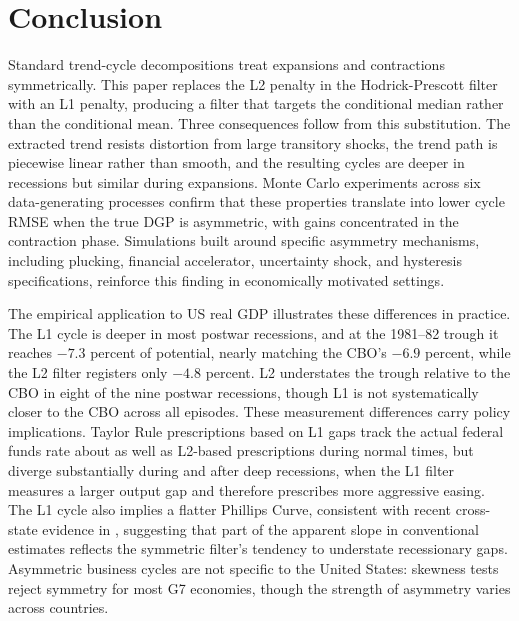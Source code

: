 \documentclass[10pt]{article}
\begin{document}
\section{Conclusion}
\label{sec:conclusion}

Standard trend-cycle decompositions treat expansions and contractions symmetrically. This paper replaces the L2 penalty in the Hodrick-Prescott filter with an L1 penalty, producing a filter that targets the conditional median rather than the conditional mean. Three consequences follow from this substitution. The extracted trend resists distortion from large transitory shocks, the trend path is piecewise linear rather than smooth, and the resulting cycles are deeper in recessions but similar during expansions. Monte Carlo experiments across six data-generating processes confirm that these properties translate into lower cycle RMSE when the true DGP is asymmetric, with gains concentrated in the contraction phase. Simulations built around specific asymmetry mechanisms, including plucking, financial accelerator, uncertainty shock, and hysteresis specifications, reinforce this finding in economically motivated settings.

The empirical application to US real GDP illustrates these differences in practice. The L1 cycle is deeper in most postwar recessions, and at the 1981--82 trough it reaches $-7.3$ percent of potential, nearly matching the CBO's $-6.9$ percent, while the L2 filter registers only $-4.8$ percent. L2 understates the trough relative to the CBO in eight of the nine postwar recessions, though L1 is not systematically closer to the CBO across all episodes. These measurement differences carry policy implications. Taylor Rule prescriptions based on L1 gaps track the actual federal funds rate about as well as L2-based prescriptions during normal times, but diverge substantially during and after deep recessions, when the L1 filter measures a larger output gap and therefore prescribes more aggressive easing. The L1 cycle also implies a flatter Phillips Curve, consistent with recent cross-state evidence in \citet{hazell_etal2022}, suggesting that part of the apparent slope in conventional estimates reflects the symmetric filter's tendency to understate recessionary gaps. Asymmetric business cycles are not specific to the United States: skewness tests reject symmetry for most G7 economies, though the strength of asymmetry varies across countries.
\end{document}
